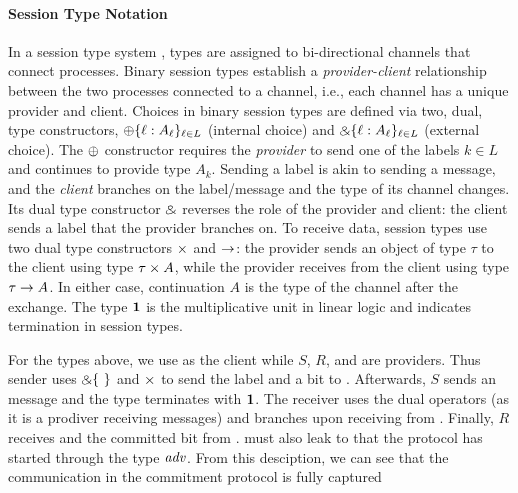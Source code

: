 \paragraph*{\textbf{Session Type Notation}}
In a session type system \cite{HondaCONCUR1993,Scalas19POPL,HondaPOPL2008},
types are assigned to bi-directional channels that connect processes.
Binary session types \cite{PfenningFOSSACS2015,Das20FSCD}
establish a \emph{provider-client} relationship between the two processes connected
to a channel, i.e., each channel has a unique provider and client.
Choices in binary session types are defined via two, dual, type constructors,
$\oplus \{ \ell : A_\ell \}_{\ell \in L}$ (internal choice) and $\mathbin{\binampersand} \{ \ell : A_\ell \}_{\ell \in L}$
(external choice).
The $\oplus$ constructor requires the \emph{provider} to send one of the labels $k \in L$
and continues to provide type $A_k$.  
Sending a label is akin to sending a message, and the \emph{client} branches on the label/message and the type of its channel changes.
Its dual type constructor $\mathbin{\binampersand}$ reverses the role of the provider and client:
the client sends a label that the provider branches on.
To receive data, session types use two dual type constructors $\times$ and $\rightarrow$:
the provider sends an object of type $\tau$ to the client using type $\tau \times A$,
while the provider receives from the client using type $\tau \rightarrow A$.
In either case, continuation $A$ is the type of the channel after the exchange.
The type $\mathbf{1}$ is the multiplicative unit in linear logic and indicates
termination in session types.

For the types above, we use \Fcom as the client while $S$, $R$, and \A are
providers.  Thus sender uses $\echoice$ and $\times$ to send the label
 and a bit to \Fcom.  Afterwards, $S$ sends an  message and
the type terminates with $\mathbf{1}$.  The receiver uses the dual operators (as it
is a prodiver receiving messages) and branches upon receiving 
from \Fcom.  Finally, $R$ receives  and the committed bit from \Fcom.
\Fcom must also leak to \A that the protocol has started through the type
$\relax{\it adv}$.  From this desciption, we can see that the communication in the
commitment protocol is fully captured

